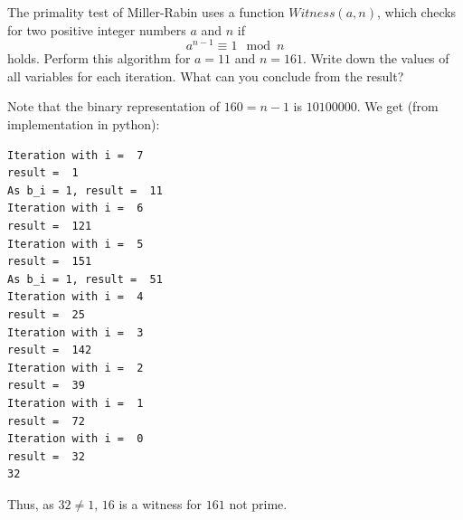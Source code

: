 \documentclass{article}
\begin{document}
\begin{exercise}
    The primality test of Miller-Rabin uses a function $Witness(a,n)$, which checks for two positive integer numbers $a$ and $n$ if 
    \begin{equation*}
        a^{n-1} \equiv 1 \mod n
    \end{equation*}
    holds. Perform this algorithm for $a = 11$ and $n = 161$. Write down the values of all variables for each iteration. What can you conclude from the result?
\end{exercise}
\begin{solving}
Note that the binary representation of $160 = n-1$ is $10100000$. We get (from implementation in python):
    \begin{verbatim}
Iteration with i =  7
result =  1
As b_i = 1, result =  11
Iteration with i =  6
result =  121
Iteration with i =  5
result =  151
As b_i = 1, result =  51
Iteration with i =  4
result =  25
Iteration with i =  3
result =  142
Iteration with i =  2
result =  39
Iteration with i =  1
result =  72
Iteration with i =  0
result =  32
32
    \end{verbatim}
    Thus, as $32\neq 1$, $16$ is a witness for $161$ not prime. 
\end{solving}
\newpage
\end{document}
